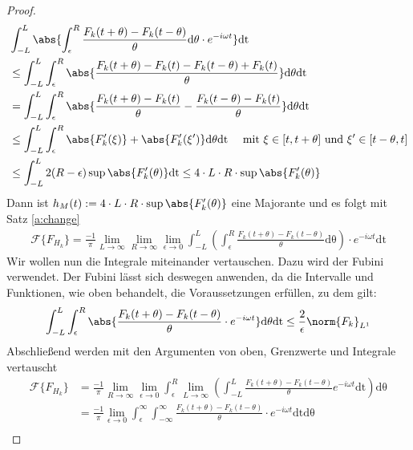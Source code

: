 \begin{satz}
\begin{proof}
\begin{align}
	&\int_{-L}^{L} \abs{\int_{\epsilon}^{R} \frac{F_k(t + \theta)- F_k(t - \theta)}{\theta} \mathrm{d\theta}\cdot e^{-i \omega t}} \mathrm{dt} \\
	&\leq \int_{-L}^{L} \int_{\epsilon}^{R} \abs{\frac{F_k(t + \theta) - F_k(t) - F_k(t - \theta) + F_k(t)}{\theta}} \mathrm{d\theta} \mathrm{dt}\\ 
	&=  \int_{-L}^{L} \int_{\epsilon}^{R} \abs{\frac{F_k(t + \theta) - F_k(t)}{\theta} - \frac{F_k(t - \theta) - F_k(t)}{\theta}} \mathrm{d\theta} \mathrm{dt}\\
	&\leq \int_{-L}^{L} \int_{\epsilon}^{R} \abs{F'_k(\xi)} + \abs{F'_k(\xi')} \mathrm{d\theta} \mathrm{dt} \quad \text{ mit } \xi \in [t, t + \theta] \text{ und } \xi' \in [t -  \theta, t]\\
	&\leq  \int_{-L}^{L} 2(R-\epsilon) \sup{\abs{F_k'(\theta)}} \mathrm{dt} \leq 4 \cdot L \cdot R \cdot \sup{\abs{F_k'(\theta)}} 
\end{align}
Dann ist $h_M(t):= 4 \cdot L \cdot R \cdot \sup{\abs{F_k'(\theta)}}$ eine Majorante und es folgt mit Satz \ref{a:change}
\begin{align}
\mathscr{F}\{F_{H_k}\} =  \frac{-1}{\pi} \lim_{L \rightarrow \infty} \lim_{R \rightarrow \infty} \lim_{\epsilon \rightarrow 0} \int_{-L}^{L} \left( \int_{\epsilon}^{R} \frac{F_k(t + \theta)- F_k(t - \theta)}{\theta} \mathrm{d\theta}\right) \cdot e^{-i \omega t} \mathrm{dt}
\end{align}
Wir wollen nun die Integrale miteinander vertauschen. Dazu wird der Fubini verwendet.
Der Fubini lässt sich deswegen anwenden, da die Intervalle und Funktionen, wie oben behandelt, die Voraussetzungen erfüllen, zu dem gilt:
\begin{align}
	\int_{-L}^{L} \int_{\epsilon}^{R} \abs{\frac{F_k(t + \theta)- F_k(t - \theta)}{\theta} \cdot e^{-i \omega t} }\mathrm{d\theta} \mathrm{dt} \leq \frac{2}{\epsilon} \norm{F_k}_{L^1}
\end{align} 
Abschließend werden mit den Argumenten von oben, Grenzwerte und Integrale vertauscht
\begin{align}
\mathscr{F}\{F_{H_k}\} &= \frac{-1}{\pi} \lim_{R \rightarrow \infty} \lim_{\epsilon \rightarrow 0} \int_{\epsilon}^{R} \lim_{L \rightarrow \infty} \left( \int_{-L}^{L} \frac{F_k(t + \theta)- F_k(t - \theta)}{\theta}  e^{-i \omega t} \mathrm{dt} \right) \mathrm{d\theta} \\ &= \frac{-1}{\pi} \lim_{\epsilon \rightarrow 0} \int_{\epsilon}^{\infty} \int_{-\infty}^{\infty} \frac{F_k(t + \theta)- F_k(t - \theta)}{\theta} \cdot e^{-i \omega t} \mathrm{dt} \mathrm{d\theta}\\

\end{align}
\end{proof}
\end{satz}
